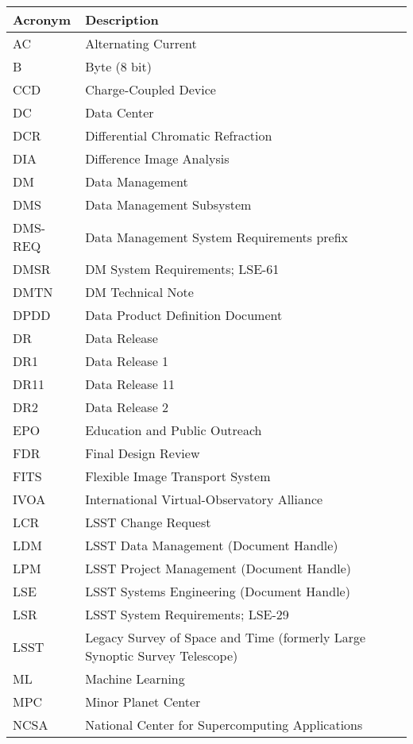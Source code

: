 \addtocounter{table}{-1}
\begin{longtable}{p{}p{}}\hline
\textbf{Acronym} & \textbf{Description}  \\\hline

AC & Alternating Current \\\hline
B & Byte (8 bit) \\\hline
CCD & Charge-Coupled Device \\\hline
DC & Data Center \\\hline
DCR & Differential Chromatic Refraction \\\hline
DIA & Difference Image Analysis \\\hline
DM & Data Management \\\hline
DMS & Data Management Subsystem \\\hline
DMS-REQ & Data Management System Requirements prefix \\\hline
DMSR & DM System Requirements; LSE-61 \\\hline
DMTN & DM Technical Note \\\hline
DPDD & Data Product Definition Document \\\hline
DR & Data Release \\\hline
DR1 & Data Release 1 \\\hline
DR11 & Data Release 11 \\\hline
DR2 & Data Release 2 \\\hline
EPO & Education and Public Outreach \\\hline
FDR & Final Design Review \\\hline
FITS & Flexible Image Transport System \\\hline
IVOA & International Virtual-Observatory Alliance \\\hline
LCR & LSST Change Request \\\hline
LDM & LSST Data Management (Document Handle) \\\hline
LPM & LSST Project Management (Document Handle) \\\hline
LSE & LSST Systems Engineering (Document Handle) \\\hline
LSR & LSST System Requirements; LSE-29 \\\hline
LSST & Legacy Survey of Space and Time (formerly Large Synoptic Survey Telescope) \\\hline
ML & Machine Learning \\\hline
MPC & Minor Planet Center \\\hline
NCSA & National Center for Supercomputing Applications \\\hline

\end{longtable}
